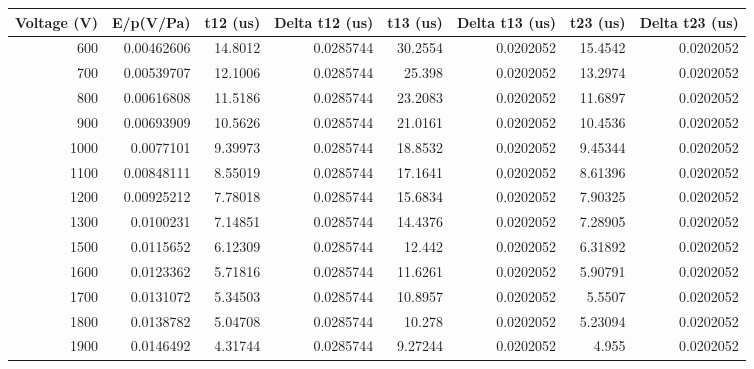 \begin{tabular}{rrrrrrrr}
\hline
   Voltage (V) &   E/p(V/Pa) &   t12 (us) &   Delta t12 (us) &   t13 (us) &    Delta t13 (us) &   t23 (us) &   Delta t23 (us) \\
\hline
           600 &               0.00462606 &   14.8012  &        0.0285744 &   30.2554  &         0.0202052 &   15.4542  &        0.0202052 \\
           700 &               0.00539707 &   12.1006  &        0.0285744 &   25.398   &         0.0202052 &   13.2974  &        0.0202052 \\
           800 &               0.00616808 &   11.5186  &        0.0285744 &   23.2083  &         0.0202052 &   11.6897  &        0.0202052 \\
           900 &               0.00693909 &   10.5626  &        0.0285744 &   21.0161  &         0.0202052 &   10.4536  &        0.0202052 \\
          1000 &               0.0077101  &    9.39973 &        0.0285744 &   18.8532  &         0.0202052 &    9.45344 &        0.0202052 \\
          1100 &               0.00848111 &    8.55019 &        0.0285744 &   17.1641  &         0.0202052 &    8.61396 &        0.0202052 \\
          1200 &               0.00925212 &    7.78018 &        0.0285744 &   15.6834  &         0.0202052 &    7.90325 &        0.0202052 \\
          1300 &               0.0100231  &    7.14851 &        0.0285744 &   14.4376  &         0.0202052 &    7.28905 &        0.0202052 \\
          1500 &               0.0115652  &    6.12309 &        0.0285744 &   12.442   &         0.0202052 &    6.31892 &        0.0202052 \\
          1600 &               0.0123362  &    5.71816 &        0.0285744 &   11.6261  &         0.0202052 &    5.90791 &        0.0202052 \\
          1700 &               0.0131072  &    5.34503 &        0.0285744 &   10.8957  &         0.0202052 &    5.5507  &        0.0202052 \\
          1800 &               0.0138782  &    5.04708 &        0.0285744 &   10.278   &         0.0202052 &    5.23094 &        0.0202052 \\
          1900 &               0.0146492  &    4.31744 &        0.0285744 &    9.27244 &         0.0202052 &    4.955   &        0.0202052 \\

\end{tabular}
